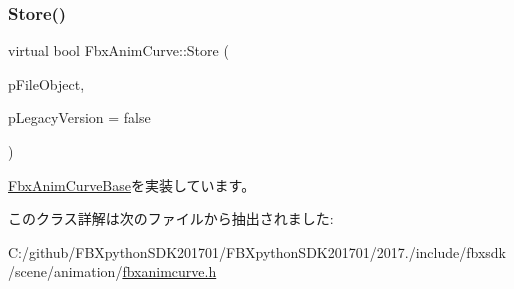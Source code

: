 \subsubsection{\texorpdfstring{Store()}{Store()}}
{\footnotesize\ttfamily virtual bool Fbx\+Anim\+Curve\+::\+Store (\begin{DoxyParamCaption}\item[{\hyperlink{class_fbx_i_o}{Fbx\+IO} $\ast$}]{p\+File\+Object,  }\item[{bool}]{p\+Legacy\+Version = {\ttfamily false} }\end{DoxyParamCaption})\hspace{0.3cm}{\ttfamily [pure virtual]}}



\hyperlink{class_fbx_anim_curve_base_a82eba55521f1c0e792b71cb432dac170}{Fbx\+Anim\+Curve\+Base}を実装しています。



このクラス詳解は次のファイルから抽出されました\+:\begin{DoxyCompactItemize}
\item 
C\+:/github/\+F\+B\+Xpython\+S\+D\+K201701/\+F\+B\+Xpython\+S\+D\+K201701/2017./include/fbxsdk/scene/animation/\hyperlink{fbxanimcurve_8h}{fbxanimcurve.\+h}\end{DoxyCompactItemize}
